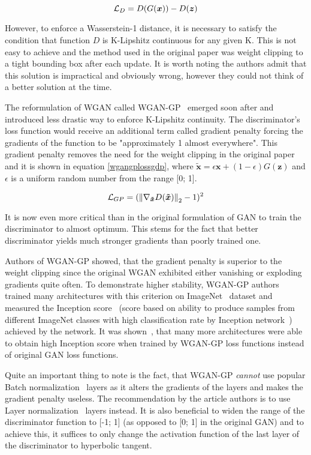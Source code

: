 \begin{equation}
\mathcal{L}_D = D(G(\bm{x})) - D(\bm{z})
\label{wganlossd}
\end{equation}

However, to enforce a Wasserstein-1 distance, it is necessary to satisfy the condition that function $D$ is K-Lipshitz continuous for any given K. This is not easy to achieve and the method used in the original paper was weight clipping to a tight bounding box after each update. It is worth noting the authors admit that this solution is impractical and obviously wrong, however they could not think of a better solution at the time.

The reformulation of WGAN called WGAN-GP~\cite{wgan-gp} emerged soon after and introduced less drastic way to enforce K-Lipshitz continuity. The discriminator's loss function would receive an additional term called gradient penalty forcing the gradients of the function to be "approximately 1 almost everywhere". This gradient penalty removes the need for the weight clipping in the original paper and it is shown in equation \ref{wgangplossgdp}, where $\bm{\tilde{x}} = \epsilon\bm{x} + (1 - \epsilon)G(\bm{z})$ and $\epsilon$ is a uniform random number from the range [0; 1].

\begin{equation}
\mathcal{L}_{GP} = (\left\lVert\nabla_{\bm{\tilde{x}}}D(\bm{\tilde{x}})\right\rVert_2 - 1)^2
\label{wgangplossgdp}
\end{equation}

It is now even more critical than in the original formulation of GAN to train the discriminator to almost optimum. This stems for the fact that better discriminator yields much stronger gradients than poorly trained one.

Authors of WGAN-GP showed, that the gradient penalty is superior to the weight clipping since the original WGAN exhibited either vanishing or exploding gradients quite often. To demonstrate higher stability, WGAN-GP authors trained many architectures with this criterion on ImageNet~\cite{imagenet} dataset and measured the Inception score~\cite{improvedgan} (score based on ability to produce samples from different ImageNet classes with high classification rate by Inception network~\cite{inception}) achieved by the network. It was shown~\cite{wgan-gp}, that many more architectures were able to obtain high Inception score when trained by WGAN-GP loss functions instead of original GAN loss functions.

Quite an important thing to note is the fact, that WGAN-GP {\em cannot} use popular Batch normalization~\cite{batchnorm} layers as it alters the gradients of the layers and makes the gradient penalty useless. The recommendation by the article authors is to use Layer normalization~\cite{layernorm} layers instead. It is also beneficial to widen the range of the discriminator function to [-1; 1] (as opposed to [0; 1] in the original GAN) and to achieve this, it suffices to only change the activation function of the last layer of the discriminator to hyperbolic tangent.

